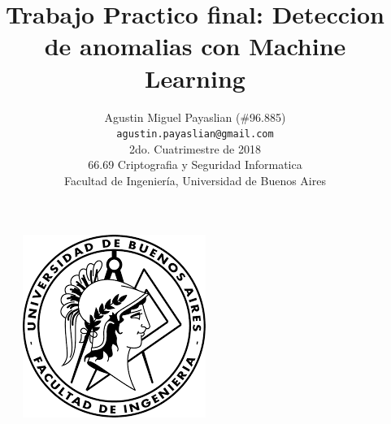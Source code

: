 \documentclass[a4paper,10pt]{article}
\begin{document}
\pagestyle{fancy}
\fancyhf{}

\fancyfoot[R]{\thepage}


\title{\textbf{Trabajo Practico final: Deteccion de anomalias con Machine Learning}}



\author{Agustin Miguel Payaslian (\#96.885)\\
\vspace{5mm}
\texttt{agustin.payaslian@gmail.com}\\
\vspace{5mm}
\normalsize{2do. Cuatrimestre de 2018}\\
\vspace{5mm}
\normalsize{66.69 Criptografia y Seguridad Informatica}\\
\vspace{5mm}
\normalsize{Facultad de Ingeniería, Universidad de Buenos Aires}\\
}
\date{}


\maketitle

\vspace{5mm}
\begin{figure}[!htp]
\centering
\includegraphics[scale=1]{Logo.png} 
\end{figure}
\vspace{5mm}
\end{document}
